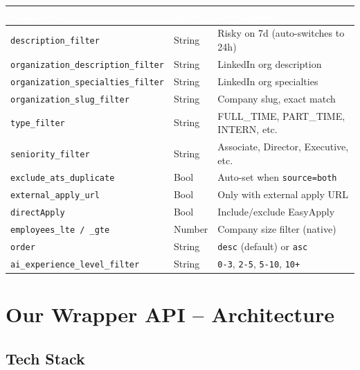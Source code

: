 \documentclass[11pt, a4paper]{article}
\begin{document}
\begin{center}\small
\begin{tabularx}{\textwidth}{|L{4.5cm}|C{1.5cm}|X|}
\hline
{}
\textcolor{white}{\textbf{Parameter}} & \textcolor{white}{\textbf{Type}} & \textcolor{white}{\textbf{Description}} \\
\hline
\texttt{description\_filter} & String & Risky on 7d (auto-switches to 24h) \\
\texttt{organization\_description\_filter} & String & LinkedIn org description \\
\texttt{organization\_specialties\_filter} & String & LinkedIn org specialties \\
\texttt{organization\_slug\_filter} & String & Company slug, exact match \\
\texttt{type\_filter} & String & FULL\_TIME, PART\_TIME, INTERN, etc. \\
\texttt{seniority\_filter} & String & Associate, Director, Executive, etc. \\
\texttt{exclude\_ats\_duplicate} & Bool & Auto-set when \texttt{source=both} \\
\texttt{external\_apply\_url} & Bool & Only with external apply URL \\
\texttt{directApply} & Bool & Include/exclude EasyApply \\
\texttt{employees\_lte / \_gte} & Number & Company size filter (native) \\
\texttt{order} & String & \texttt{desc} (default) or \texttt{asc} \\
\texttt{ai\_experience\_level\_filter} & String & \texttt{0-3}, \texttt{2-5}, \texttt{5-10}, \texttt{10+} \\
\hline
\end{tabularx}
\end{center}

\newpage
\section{Our Wrapper API -- Architecture}

\subsection{Tech Stack}
\end{document}
